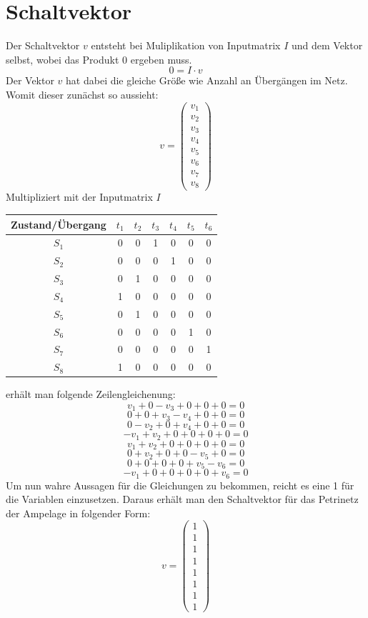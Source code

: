 \documentclass{article}
\begin{document}
	\section{Schaltvektor}
		Der Schaltvektor $v$ entsteht bei Muliplikation von Inputmatrix $I$ und dem Vektor selbst, wobei das Produkt $0$ ergeben muss.
		$$0 = I \cdot v$$
		Der Vektor $v$ hat dabei die gleiche Größe wie Anzahl an Übergängen im Netz. Womit dieser zunächst so aussieht:\\
		$$v =
			\begin{pmatrix}
				v_1\\
				v_2\\
				v_3\\
				v_4\\
				v_5\\
				v_6\\
				v_7\\
				v_8			
			\end{pmatrix}
		$$
\newpage
		Multipliziert mit der Inputmatrix $I$
		\begin{center}
			\begin{tabular}{| c || c c c c c c |}
				\hline
				Zustand/Übergang	 & $t_1$ & $t_2$ & $t_3$ & $t_4$ & $t_5$ & $t_6$ \\
				\hline\hline
				$S_1$ & 0 & 0 & 1 & 0 & 0 & 0\\
				$S_2$ & 0 & 0 & 0 & 1 & 0 & 0\\
				$S_3$ & 0 & 1 & 0 & 0 & 0 & 0\\
				$S_4$ & 1 & 0 & 0 & 0 & 0 & 0\\
				$S_5$ & 0 & 1 & 0 & 0 & 0 & 0\\
				$S_6$ & 0 & 0 & 0 & 0 & 1 & 0\\
				$S_7$ & 0 & 0 & 0 & 0 & 0 & 1\\
				$S_8$ & 1 & 0 & 0 & 0 & 0 & 0\\
				\hline
			\end{tabular}
		\end{center}
		erhält man folgende Zeilengleichenung:
		$$v_1 + 0 - v_3 + 0 + 0 + 0 = 0$$
		$$0 + 0 + v_3 - v_4 + 0 + 0 = 0$$
		$$0 - v_2 + 0 + v_4 + 0 + 0 = 0$$
		$$-v_1 + v_2 + 0 + 0 + 0 + 0 = 0$$
		$$v_1 + v_2 + 0 + 0 + 0 + 0 = 0$$
		$$0 + v_2 + 0 + 0 - v_5 + 0 = 0$$
		$$0 + 0 + 0 + 0 + v_5 - v_6= 0$$
		$$-v_1 + 0 + 0 + 0 + 0 + v_6= 0$$
\vspace{5mm}
		Um nun wahre Aussagen für die Gleichungen zu bekommen, reicht es eine 1 für die Variablen einzusetzen. Daraus erhält man den Schaltvektor für das Petrinetz der Ampelage in folgender Form:
		$$v = 
			\begin{pmatrix}
				1\\
				1\\
				1\\
				1\\
				1\\
				1\\
				1\\
				1			
			\end{pmatrix}
		$$
\newpage
\end{document}
